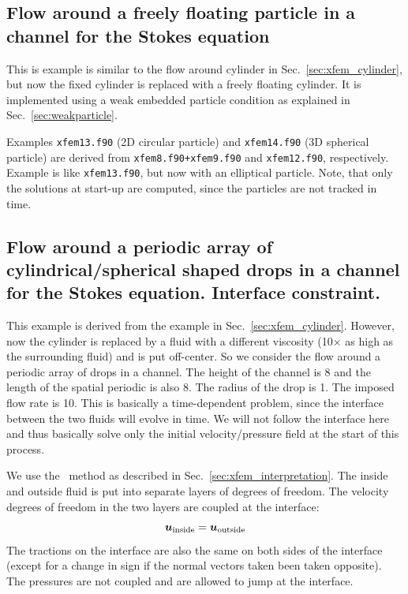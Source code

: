\subsection{Flow around a freely floating particle in a channel 
for the Stokes equation}
\label{sec:xfem_particle}

This is example is similar to the flow around cylinder in
Sec.~\ref{sec:xfem_cylinder}, but now the fixed cylinder is replaced with a
freely floating cylinder. It is implemented using a weak embedded particle
condition as explained in Sec.~\ref{sec:weakparticle}. 

Examples \texttt{xfem13.f90} (2D circular particle) and \texttt{xfem14.f90} (3D
spherical particle) are derived from
\texttt{xfem8.f90+xfem9.f90} and \texttt{xfem12.f90}, respectively.
Example is like \texttt{xfem13.f90}, but now with an elliptical particle.
Note, that
only the solutions at start-up are computed,
since the particles are not tracked in time.

\subsection{Flow around a periodic array of cylindrical/spherical shaped drops
in a channel for the Stokes equation. Interface constraint.}
\label{sec:drop1}

This example is derived from the example in Sec.~\ref{sec:xfem_cylinder}.
However, now the cylinder is replaced by a fluid with a different viscosity
(10$\times$ as high as the surrounding fluid) and is put off-center.
So we consider the flow around a periodic array of drops in a
channel. The height of the channel is 8 and
the length of the spatial periodic is also 8. The radius of the drop is 1.
The imposed flow rate is 10. This is basically a time-dependent problem, since the interface
between the two fluids will evolve in time. 
We will not follow the interface here and thus basically solve only the 
initial velocity/pressure field at the start of this process.

We use the \xfem\ method as described in Sec.~\ref{sec:xfem_interpretation}.
The inside and outside fluid is put into separate layers of degrees of freedom.
The velocity degrees of freedom in the two layers are coupled at the
interface:
\begin{equation}
   \boldsymbol{u}_\text{inside} = \boldsymbol{u}_\text{outside} 
   \label{eq:velocitycont}
\end{equation}
The tractions on the interface are also the same on both sides of the
interface (except for a change in sign if the normal vectors taken been taken
opposite).
The pressures are not coupled and are allowed to jump at the interface.

